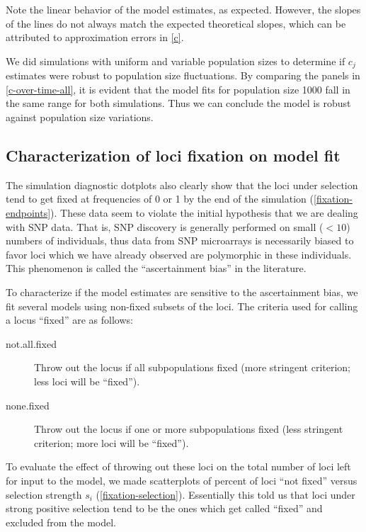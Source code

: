 \documentclass[a4paper,12pt]{article}
\begin{document}

Note the linear behavior of the model estimates, as expected. However,
the slopes of the lines do not always match the expected theoretical
slopes, which can be attributed to approximation errors in
\autoref{c}.

We did simulations with uniform and variable population sizes to
determine if $c_j$ estimates were robust to population size
fluctuations. By comparing the panels in \autoref{c-over-time-all}, it
is evident that the model fits for population size 1000 fall in the
same range for both simulations. Thus we can conclude the model is
robust against population size variations.

\subsection{Characterization of loci fixation on model fit}

The simulation diagnostic dotplots also clearly show that the loci
under selection tend to get fixed at frequencies of 0 or 1 by the end
of the simulation (\autoref{fixation-endpoints}). These data seem to
violate the initial hypothesis that we are dealing with SNP data. That
is, SNP discovery is generally performed on small ($<10$) numbers of
individuals, thus data from SNP microarrays is necessarily biased to
favor loci which we have already observed are polymorphic in these
individuals. This phenomenon is called the ``ascertainment bias'' in
the literature.

To characterize if the model estimates are sensitive to the
ascertainment bias, we fit several models using non-fixed subsets of
the loci. The criteria used for calling a locus ``fixed'' are as
follows:
\begin{description}
\item[not.all.fixed] Throw out the locus if all subpopulations fixed
  (more stringent criterion; less loci will be ``fixed'').
\item[none.fixed] Throw out the locus if one or more subpopulations
  fixed (less stringent criterion; more loci will be ``fixed'').
\end{description}

To evaluate the effect of throwing out these loci on the total number
of loci left for input to the model, we made scatterplots of percent
of loci ``not fixed'' versus selection strength $s_i$
(\autoref{fixation-selection}). Essentially this told us that loci
under strong positive selection tend to be the ones which get called
``fixed'' and excluded from the model.
\end{document}
